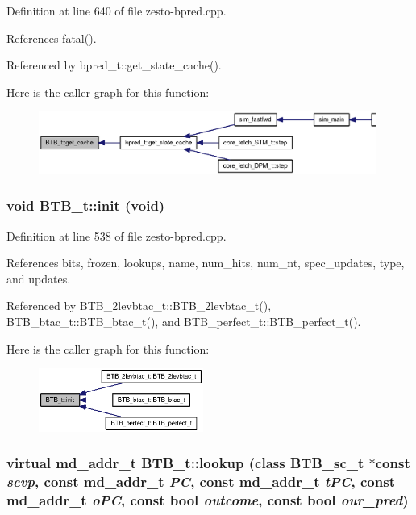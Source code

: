 Definition at line 640 of file zesto-bpred.cpp.

References fatal().

Referenced by bpred\_\-t::get\_\-state\_\-cache().

Here is the caller graph for this function:\nopagebreak
\begin{figure}[H]
\begin{center}
\leavevmode
\includegraphics[width=314pt]{classBTB__t_32e582b73ba10d49a70208b29c823af4_icgraph}
\end{center}
\end{figure}
\subsubsection[{init}]{\setlength{\rightskip}{0pt plus 5cm}void BTB\_\-t::init (void)\hspace{0.3cm}{\tt  [protected]}}\label{classBTB__t_ac35b3c68a69d553e5394423591cf936}




Definition at line 538 of file zesto-bpred.cpp.

References bits, frozen, lookups, name, num\_\-hits, num\_\-nt, spec\_\-updates, type, and updates.

Referenced by BTB\_\-2levbtac\_\-t::BTB\_\-2levbtac\_\-t(), BTB\_\-btac\_\-t::BTB\_\-btac\_\-t(), and BTB\_\-perfect\_\-t::BTB\_\-perfect\_\-t().

Here is the caller graph for this function:\nopagebreak
\begin{figure}[H]
\begin{center}
\leavevmode
\includegraphics[width=153pt]{classBTB__t_ac35b3c68a69d553e5394423591cf936_icgraph}
\end{center}
\end{figure}
\subsubsection[{lookup}]{\setlength{\rightskip}{0pt plus 5cm}virtual {\bf md\_\-addr\_\-t} BTB\_\-t::lookup (class {\bf BTB\_\-sc\_\-t} $\ast$const  {\em scvp}, \/  const {\bf md\_\-addr\_\-t} {\em PC}, \/  const {\bf md\_\-addr\_\-t} {\em tPC}, \/  const {\bf md\_\-addr\_\-t} {\em oPC}, \/  const bool {\em outcome}, \/  const bool {\em our\_\-pred})\hspace{0.3cm}{\tt  [pure virtual]}}\label{classBTB__t_1bf028f9f8cf5dd78a0590ebcef73b80}




